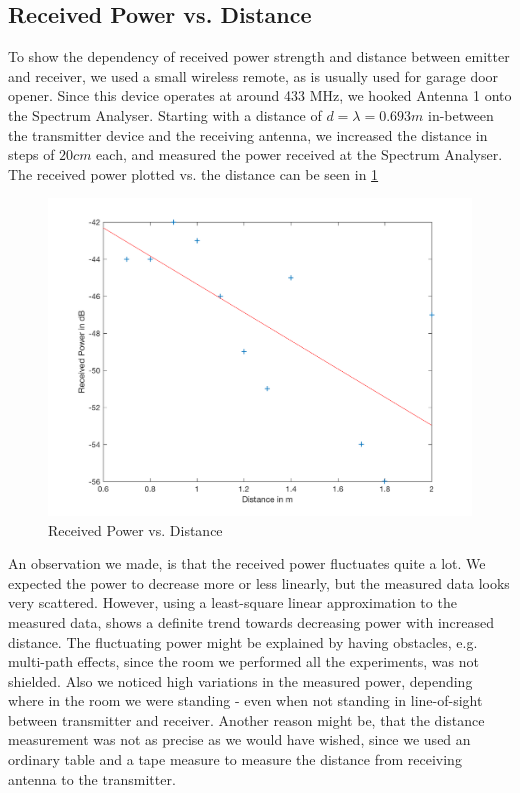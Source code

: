 \subsection{Received Power vs. Distance}
To show the dependency of received power strength and distance between emitter and receiver, we used a small wireless remote, as is usually used for garage door opener. Since this device operates at around 433 MHz, we hooked Antenna 1 onto the Spectrum Analyser. Starting with a distance of $d=\lambda=0.693m$ in-between the transmitter device and the receiving antenna, we increased the distance in steps of $20cm$ each, and measured the power received at the Spectrum Analyser.
The received power plotted vs. the distance can be seen in \cref{fig:omni}
\begin{figure}[h!]
	\centering
	\includegraphics[width=\textwidth/2+5em]{images/omnidir.png}
	\caption{Received Power vs. Distance}
	\label{fig:omni}
\end{figure}
An observation we made, is that the received power fluctuates quite a lot. We expected the power to decrease more or less linearly, but the measured data looks very scattered. However, using a least-square linear approximation to the measured data, shows a definite trend towards decreasing power with increased distance.
The fluctuating power might be explained by having obstacles, e.g. multi-path effects, since the room we performed all the experiments, was not shielded. Also we noticed high variations in the measured power, depending where in the room we were standing - even when not standing in line-of-sight between transmitter and receiver.
Another reason might be, that the distance measurement was not as precise as we would have wished, since we used an ordinary table and a tape measure to measure the distance from receiving antenna to the transmitter.




